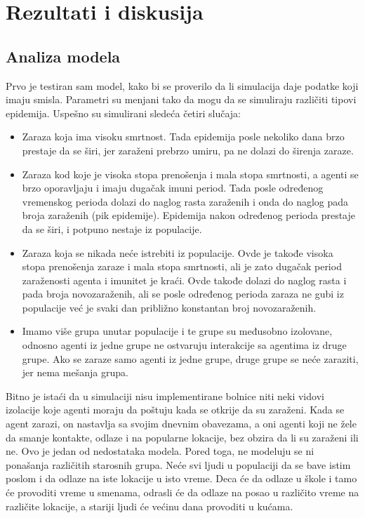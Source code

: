 \section{Rezultati i diskusija}

\subsection{Analiza modela}

Prvo je testiran sam model, kako bi se proverilo da li simulacija daje podatke koji imaju smisla. Parametri su menjani tako da mogu da se simuliraju različiti tipovi epidemija. Uspešno su simulirani sledeća četiri slučaja:

\begin{itemize}
    \item Zaraza koja ima visoku smrtnost. Tada epidemija posle nekoliko dana brzo prestaje da se širi, jer zaraženi prebrzo umiru, pa ne dolazi do širenja zaraze.
    \item Zaraza kod koje je visoka stopa prenošenja i mala stopa smrtnosti, a agenti se brzo oporavljaju i imaju dugačak imuni period. Tada posle određenog vremenskog perioda dolazi do naglog rasta zaraženih i onda do naglog pada broja zaraženih (pik epidemije). Epidemija nakon određenog perioda prestaje da se širi, i potpuno nestaje iz populacije.
    \item Zaraza koja se nikada neće istrebiti iz populacije. Ovde je takođe visoka stopa prenošenja zaraze i mala stopa smrtnosti, ali je zato dugačak period zaraženosti agenta i imunitet je kraći. Ovde takođe dolazi do naglog rasta i pada broja novozaraženih, ali se posle određenog perioda zaraza ne gubi iz populacije već je svaki dan približno konstantan broj novozaraženih. 
    \item Imamo više grupa unutar populacije i te grupe su međusobno izolovane, odnosno agenti iz jedne grupe ne ostvaruju interakcije sa agentima iz druge grupe. Ako se zaraze samo agenti iz jedne grupe, druge grupe se neće zaraziti, jer nema mešanja grupa.
\end{itemize}

Bitno je istaći da u simulaciji nisu implementirane bolnice niti neki vidovi izolacije koje agenti moraju da poštuju kada se otkrije da su zaraženi. Kada se agent zarazi, on nastavlja sa svojim dnevnim obavezama, a oni agenti koji ne žele da smanje kontakte, odlaze i na popularne lokacije, bez obzira da li su zaraženi ili ne. Ovo je jedan od nedostataka modela. Pored toga, ne modeluju se ni ponašanja različitih starosnih grupa. Neće svi ljudi u populaciji da se bave istim poslom i da odlaze na iste lokacije u isto vreme. Deca će da odlaze u škole i tamo će provoditi vreme u smenama, odrasli će da odlaze na posao u različito vreme na različite lokacije, a stariji ljudi će većinu dana provoditi u kućama.

